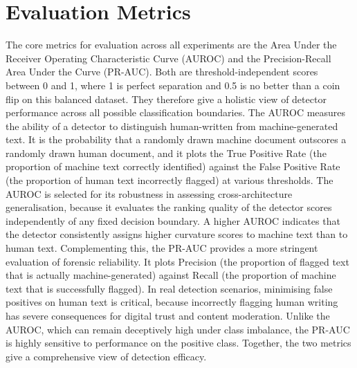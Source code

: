 \documentclass[logo,msc,cs]{infthesis}      %
\begin{document}
\section{Evaluation Metrics}
\label{sec:metrics}
The core metrics for evaluation across all experiments are the Area Under the Receiver Operating Characteristic Curve (AUROC) and the Precision-Recall Area Under the Curve (PR-AUC). Both are threshold-independent scores between 0 and 1, where 1 is perfect separation and 0.5 is no better than a coin flip on this balanced dataset. They therefore give a holistic view of detector performance across all possible classification boundaries.
The AUROC measures the ability of a detector to distinguish human-written from machine-generated text. It is the probability that a randomly drawn machine document outscores a randomly drawn human document, and it plots the True Positive Rate (the proportion of machine text correctly identified) against the False Positive Rate (the proportion of human text incorrectly flagged) at various thresholds. The AUROC is selected for its robustness in assessing cross-architecture generalisation, because it evaluates the ranking quality of the detector scores independently of any fixed decision boundary. A higher AUROC indicates that the detector consistently assigns higher curvature scores to machine text than to human text.
Complementing this, the PR-AUC provides a more stringent evaluation of forensic reliability. It plots Precision (the proportion of flagged text that is actually machine-generated) against Recall (the proportion of machine text that is successfully flagged). In real detection scenarios, minimising false positives on human text is critical, because incorrectly flagging human writing has severe consequences for digital trust and content moderation. Unlike the AUROC, which can remain deceptively high under class imbalance, the PR-AUC is highly sensitive to performance on the positive class. Together, the two metrics give a comprehensive view of detection efficacy.
\end{document}
